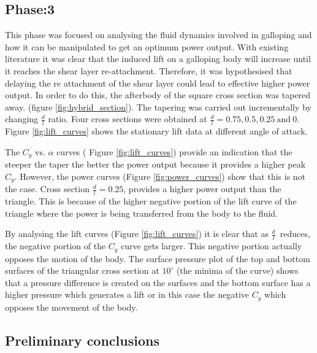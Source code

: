 \documentclass[authoryear,12pt]{article}
\newcommand{\ratio}{\ensuremath{\frac{d}{l}}}
\begin{document}
\clearpage

\subsection{Phase:3}

This phase was focused on analysing the fluid dynamics involved in galloping and how it can be manipulated to get an optimum power output. With existing literature it was clear that the induced lift on a galloping body will increase until it reaches the shear layer re-attachment. Therefore, it was hypothesised that delaying the re attachment of the shear layer could lead to effective higher power output. In order to do this, the afterbody of the square cross section was tapered away. (figure \ref{fig:hybrid_section}). The tapering was carried out incrementally by changing $\frac{d}{l}$ ratio. Four cross sections were obtained at $\frac{d}{l}= 0.75,0.5,0.25 \ \text{and} \ 0$. Figure \ref{fig:lift_curves} shows the stationary lift data at different angle of attack. 

 




The $C_y$ vs. $\alpha$ curves ( Figure \ref{fig:lift_curves}) provide an indication that the steeper the taper the better the power output because it provides a higher peak $C_y$. However, the power curves (Figure \ref{fig:power_curves}) show that this is not the case. Cross section $\ratio=0.25$, provides a higher power output than the triangle. This is because of the higher negative portion of the lift curve of the triangle where the power is being transferred from the body to the fluid.  






By analysing the lift curves (Figure \ref{fig:lift_curves}) it is clear that as \ratio \ reduces, the negative portion of the $C_y$ curve gets larger. This negative portion actually opposes the motion of the body. The surface pressure plot of the top and bottom surfaces of the triangular cross section at $10^\circ$ (the minima of the curve) shows that a pressure difference is created on the surfaces and the bottom surface has a higher pressure which generates a lift or in this case the negative $C_y$ which opposes the movement of the body. 

\subsection*{Preliminary conclusions}
\end{document}
